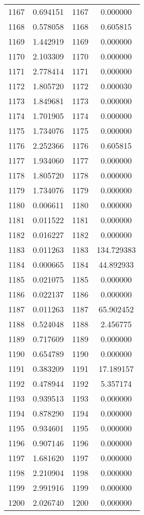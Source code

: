 \documentclass[12pt]{article}
\begin{document}
\begin{longtable}{@{}cccc@{}}
1167 & 0.694151 & 1167 & 0.000000 \\
1168 & 0.578058 & 1168 & 0.605815 \\
1169 & 1.442919 & 1169 & 0.000000 \\
1170 & 2.103309 & 1170 & 0.000000 \\
1171 & 2.778414 & 1171 & 0.000000 \\
1172 & 1.805720 & 1172 & 0.000030 \\
1173 & 1.849681 & 1173 & 0.000000 \\
1174 & 1.701905 & 1174 & 0.000000 \\
1175 & 1.734076 & 1175 & 0.000000 \\
1176 & 2.252366 & 1176 & 0.605815 \\
1177 & 1.934060 & 1177 & 0.000000 \\
1178 & 1.805720 & 1178 & 0.000000 \\
1179 & 1.734076 & 1179 & 0.000000 \\
1180 & 0.006611 & 1180 & 0.000000 \\
1181 & 0.011522 & 1181 & 0.000000 \\
1182 & 0.016227 & 1182 & 0.000000 \\
1183 & 0.011263 & 1183 & 134.729383 \\
1184 & 0.000665 & 1184 & 44.892933 \\
1185 & 0.021075 & 1185 & 0.000000 \\
1186 & 0.022137 & 1186 & 0.000000 \\
1187 & 0.011263 & 1187 & 65.902452 \\
1188 & 0.524048 & 1188 & 2.456775 \\
1189 & 0.717609 & 1189 & 0.000000 \\
1190 & 0.654789 & 1190 & 0.000000 \\
1191 & 0.383209 & 1191 & 17.189157 \\
1192 & 0.478944 & 1192 & 5.357174 \\
1193 & 0.939513 & 1193 & 0.000000 \\
1194 & 0.878290 & 1194 & 0.000000 \\
1195 & 0.934601 & 1195 & 0.000000 \\
1196 & 0.907146 & 1196 & 0.000000 \\
1197 & 1.681620 & 1197 & 0.000000 \\
1198 & 2.210904 & 1198 & 0.000000 \\
1199 & 2.991916 & 1199 & 0.000000 \\
1200 & 2.026740 & 1200 & 0.000000 \\

\end{longtable}
\end{document}
